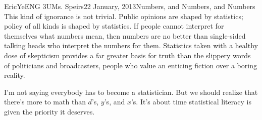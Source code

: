 \documentclass[letterpaper,12pt]{article}
\begin{document}
\begin{mla}{Eric}{Ye}{ENG 3U}{Ms. Speirs}{22 January, 2013}{Numbers, and Numbers, and Numbers}
This kind of ignorance is not trivial. Public opinions are shaped by statistics; policy of all kinds is shaped by statistics. If people cannot interpret for themselves what numbers mean, then numbers are no better than single-sided talking heads who interpret the numbers for them.
Statistics taken with a healthy dose of skepticism provides a far greater basis for truth than the slippery words of politicians and broadcasters, people who value an enticing fiction over a boring reality.

I'm not saying everybody has to become a statistician. But we should realize that there's more to math than $d$'s, $y$'s, and $x$'s. It's about time statistical literacy is given the priority it deserves.


\end{mla}
\end{document}
